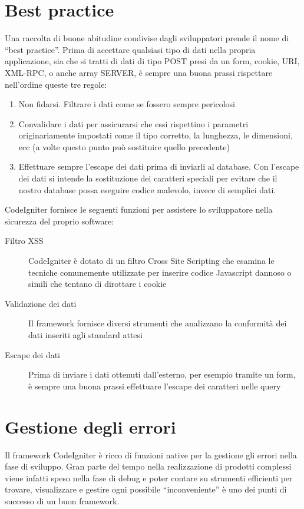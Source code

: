 \section*{Best practice}
Una raccolta di buone abitudine condivise dagli sviluppatori prende il nome di ``best practice''. Prima di accettare qualsiasi tipo di dati nella propria applicazione, sia che si tratti di dati di tipo POST presi da un form, cookie, URI, XML-RPC, o anche array SERVER, è sempre una buona prassi rispettare nell'ordine queste tre regole:

\begin{enumerate}
\item Non fidarsi. Filtrare i dati come se fossero sempre pericolosi
\item Convalidare i dati per assicurarsi che essi rispettino i parametri originariamente impostati come il tipo corretto, la lunghezza, le dimensioni, ecc (a volte questo punto può sostituire quello precedente)
\item Effettuare sempre l'escape dei dati prima di inviarli al database. Con l'escape dei dati si intende la sostituzione dei caratteri speciali per evitare che il nostro database possa eseguire codice malevolo, invece di semplici dati.
\end{enumerate}

CodeIgniter fornisce le seguenti funzioni per assistere lo sviluppatore nella sicurezza del proprio software:

\begin{description}
\item[Filtro XSS] CodeIgniter è dotato di un filtro Cross Site Scripting che esamina le tecniche comunemente utilizzate per inserire codice Javascript dannoso o simili che tentano di dirottare i cookie 
\item[Validazione dei dati] Il framework fornisce diversi strumenti che analizzano la conformità dei dati inseriti agli standard attesi
\item[Escape dei dati] Prima di inviare i dati ottenuti dall'esterno, per esempio tramite un form, è sempre una buona prassi effettuare l'escape dei caratteri nelle query
\end{description}

\section*{Gestione degli errori}
Il framework CodeIgniter è ricco di funzioni native per la gestione gli errori nella fase di sviluppo. Gran parte del tempo nella realizzazione di prodotti complessi viene infatti speso nella fase di debug e poter contare su strumenti efficienti per trovare, visualizzare e gestire ogni possibile ``inconveniente'' è uno dei punti di successo di un buon framework. 

